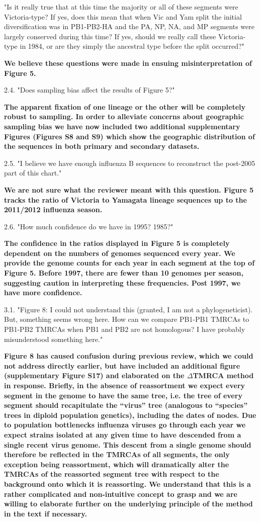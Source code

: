 \documentclass[11pt,oneside,letterpaper]{article}
\begin{document}
"Is it really true that at this time the majority or all of these segments were Victoria-type?
If yes, does this mean that when Vic and Yam split the initial diversification was in PB1-PB2-HA and the PA, NP, NA, and MP segments were largely conserved during this time?
If yes, should we really call these Victoria-type in 1984, or are they simply the ancestral type before the split occurred?"

\textbf{We believe these questions were made in ensuing misinterpretation of Figure 5.}

2.4. "Does sampling bias affect the results of Figure 5?"

\textbf{The apparent fixation of one lineage or the other will be completely robust to sampling.
In order to alleviate concerns about geographic sampling bias we have now included two additional supplementary Figures (Figures S8 and S9) which show the geographic distribution of the sequences in both primary and secondary datasets.}

2.5. "I believe we have enough influenza B sequences to reconstruct the post-2005 part of this chart." 

\textbf{We are not sure what the reviewer meant with this question.
Figure 5 tracks the ratio of Victoria to Yamagata lineage sequences up to the 2011/2012 influenza season.}

2.6. "How much confidence do we have in 1995?
1985?"

\textbf{The confidence in the ratios displayed in Figure 5 is completely dependent on the numbers of genomes sequenced every year.
We provide the genome counts for each year in each segment at the top of Figure 5.
Before 1997, there are fewer than 10 genomes per season, suggesting caution in interpreting these frequencies.
Post 1997, we have more confidence.}

3.1. "Figure 8:  I could not understand this (granted, I am not a phylogeneticist).
But, something seems wrong here.
How can we compare PB1-PB1 TMRCAs to PB1-PB2 TMRCAs when PB1 and PB2 are not homologous?
I have probably misunderstood something here."

\textbf{Figure 8 has caused confusion during previous review, which we could not address directly earlier, but have included an additional figure (supplementary Figure S17) and elaborated on the $\Delta$TMRCA method in response.
Briefly, in the absence of reassortment we expect every segment in the genome to have the same tree, i.e. the tree of every segment should recapitulate the ``virus'' tree (analogous to ``species'' trees in diploid population genetics), including the dates of nodes.
Due to population bottlenecks influenza viruses go through each year we expect strains isolated at any given time to have descended from a single recent virus genome.
This descent from a single genome should therefore be reflected in the TMRCAs of all segments, the only exception being reassortment, which will dramatically alter the TMRCAs of the reassorted segment tree with respect to the background onto which it is reassorting.
We understand that this is a rather complicated and non-intuitive concept to grasp and we are willing to elaborate further on the underlying principle of the method in the text if necessary.}
\end{document}
